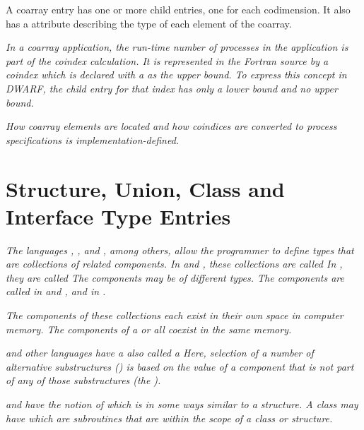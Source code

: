 A coarray entry has one or more \DWTAGsubrangetype{} child entries,
one for each codimension. It also has a \DWATtype{} attribute
describing the type of each element of the coarray.

\textit{In a coarray application, the run-time number of processes in the application
is part of the coindex calculation.  It is represented in the Fortran source by
a coindex which is declared with a \doublequote{*} as the upper bound.  To express this
concept in DWARF, the \DWTAGsubrangetype{} child entry for that index has
only a lower bound and no upper bound.}

\textit{How coarray elements are located and how coindices are
converted to process specifications is implementation-defined.}

\section{Structure, Union, Class and Interface Type Entries}
\label{chap:structureunionclassandinterfacetypeentries}

\textit{The languages
,
, and
, among others, allow the
programmer to define types that are collections of related
components.
In  and , these collections are called
In , they are called 
The components may be of different types. The components are
called  in  and
, and  in .}

\textit{The components of these collections each exist in their
own space in computer memory. The components of a  or 
 all coexist in the same memory.}

\textit{ and
other languages have a 
also called a  Here, selection of a
number of alternative substructures () is based
on the value of a component that is not part of any of those
substructures (the ).}

\textit{ and
 have the notion of  which is in some
ways similar to a structure. A class may have  which are subroutines that are within the scope
of a class or structure.}

